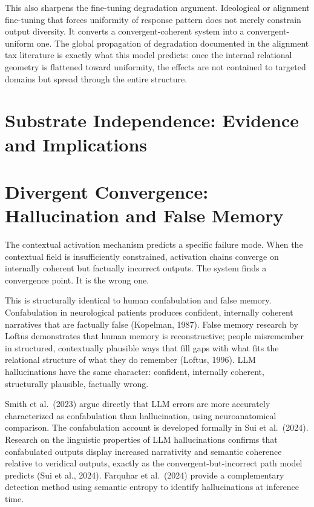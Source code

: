 \documentclass[12pt]{article}
\begin{document}
This also sharpens the fine-tuning degradation argument. Ideological or
alignment fine-tuning that forces uniformity of response pattern does
not merely constrain output diversity. It converts a convergent-coherent
system into a convergent-uniform one. The global propagation of
degradation documented in the alignment tax literature is exactly what
this model predicts: once the internal relational geometry is flattened
toward uniformity, the effects are not contained to targeted domains but
spread through the entire structure.

\bigskip

\section{Substrate Independence: Evidence and
Implications}\label{substrate-independence-evidence-and-implications}

\section{Divergent Convergence: Hallucination and False
Memory}\label{divergent-convergence-hallucination-and-false-memory}

The contextual activation mechanism predicts a specific failure mode.
When the contextual field is insufficiently constrained, activation
chains converge on internally coherent but factually incorrect outputs.
The system finds a convergence point. It is the wrong one.

This is structurally identical to human confabulation and false memory.
Confabulation in neurological patients produces confident, internally
coherent narratives that are factually false (Kopelman, 1987). False
memory research by Loftus demonstrates that human memory is
reconstructive; people misremember in structured, contextually plausible
ways that fill gaps with what fits the relational structure of what they
do remember (Loftus, 1996). LLM hallucinations have the same character:
confident, internally coherent, structurally plausible, factually wrong.

Smith et al.~(2023) argue directly that LLM errors are more accurately
characterized as confabulation than hallucination, using neuroanatomical
comparison. The confabulation account is developed formally in Sui et
al.~(2024). Research on the linguistic properties of LLM hallucinations
confirms that confabulated outputs display increased narrativity and
semantic coherence relative to veridical outputs, exactly as the
convergent-but-incorrect path model predicts (Sui et al., 2024).
Farquhar et al.~(2024) provide a complementary detection method using
semantic entropy to identify hallucinations at inference time.
\end{document}
